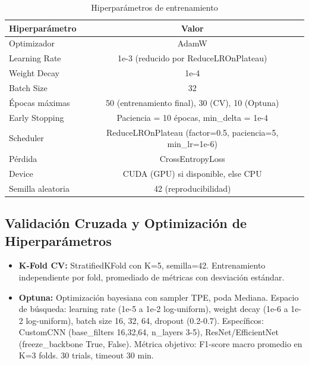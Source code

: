 \documentclass[12pt,a4paper]{article}
\begin{document}
\begin{table}[H]
\centering
\caption{Hiperparámetros de entrenamiento}
\label{tab:hyperparams}
\begin{tabular}{lc}
\toprule
\textbf{Hiperparámetro} & \textbf{Valor} \\
\midrule
Optimizador & AdamW \\
Learning Rate & 1e-3 (reducido por ReduceLROnPlateau) \\
Weight Decay & 1e-4 \\
Batch Size & 32 \\
Épocas máximas & 50 (entrenamiento final), 30 (CV), 10 (Optuna) \\
Early Stopping & Paciencia = 10 épocas, min\_delta = 1e-4 \\
Scheduler & ReduceLROnPlateau (factor=0.5, paciencia=5, min\_lr=1e-6) \\
Pérdida & CrossEntropyLoss \\
Device & CUDA (GPU) si disponible, else CPU \\
Semilla aleatoria & 42 (reproducibilidad) \\
\bottomrule
\end{tabular}
\end{table}

\subsection{Validación Cruzada y Optimización de Hiperparámetros}

\begin{itemize}
    \item \textbf{K-Fold CV:} StratifiedKFold con K=5, semilla=42. Entrenamiento independiente 
          por fold, promediado de métricas con desviación estándar.
    \item \textbf{Optuna:} Optimización bayesiana con sampler TPE, poda Mediana. 
          Espacio de búsqueda: learning rate (1e-5 a 1e-2 log-uniform), weight decay 
          (1e-6 a 1e-2 log-uniform), batch size {16, 32, 64}, dropout (0.2-0.7). 
          Específicos: CustomCNN (base\_filters {16,32,64}, n\_layers {3-5}), 
          ResNet/EfficientNet (freeze\_backbone {True, False}). 
          Métrica objetivo: F1-score macro promedio en K=3 folds. 30 trials, timeout 30 min.
\end{itemize}
\end{document}
